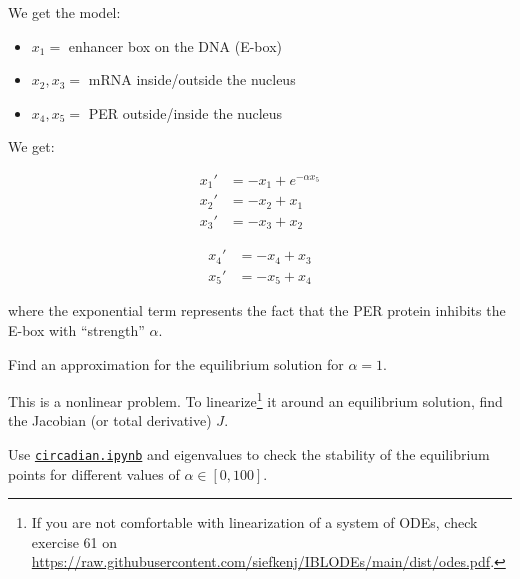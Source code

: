 \begin{slide}
\begin{problem}
We get the model:
\begin{itemize}
	\item $x_1 = $ enhancer box on the DNA (E-box)
	\item $x_2, x_3 = $ mRNA inside/outside the nucleus
	\item $x_4, x_5 = $ PER outside/inside the nucleus
\end{itemize}
We get:

\hfil \begin{minipage}{.4\textwidth}
\begin{align*}
	x_1' & = -x_1 + e^{-\alpha x_5} \\
	x_2' & = -x_2 + x_1 \\
	x_3' & = -x_3+ x_2 
\end{align*}	
\end{minipage}
\quad 
\begin{minipage}{.4\textwidth}
\begin{align*}
	x_4' & = -x_4 + x_3 \\
	x_5' & = -x_5+ x_4 
\end{align*}	
\end{minipage}

where the exponential term represents the fact that the PER protein inhibits the E-box with ``strength'' $\alpha$.
\end{problem}

\begin{parts}
	\item Find an approximation for the equilibrium solution for $\alpha = 1$.
	\item This is a nonlinear problem. To linearize\footnote{If you are not comfortable with linearization of a system of ODEs, check exercise 61 on \url{https://raw.githubusercontent.com/siefkenj/IBLODEs/main/dist/odes.pdf}.} it around an equilibrium solution, find the Jacobian (or total derivative) $J$.
	\item Use \href{https://utoronto.syzygy.ca/jupyter/user-redirect/git-pull?repo=https://github.com/bigfatbernie/IBLMathModeling&subPath=book/python/circadian.ipynb}{\tt circadian.ipynb} and eigenvalues to check the stability of the equilibrium points for different values of $\alpha \in [0,100]$.
\end{parts}

%



\end{slide}


